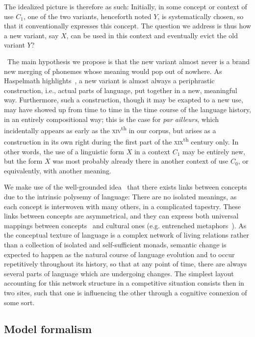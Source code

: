 \documentclass[12pt,twocolumn,amsmath,amssymb,aps,longbibliography]{revtex4-1}  %
\newcommand{\tit}{\textit}
\begin{document}
The idealized picture is therefore as such: Initially, in some concept or context of use $C_1$, one of the two variants, henceforth noted $Y$, is systematically chosen, so that it conventionally expresses this concept. The question we address is thus how a new variant, say $X$, can be used in this context and eventually evict the old variant $Y$?

\ The main hypothesis we propose is that the new variant almost never is a brand new merging of phonemes whose meaning would pop out of nowhere. As Haspelmath highlights~\cite{haspelmath1999grammaticalization}, a new variant is almost always a periphrastic construction, i.e., actual parts of language, put together in a new, meaningful way. Furthermore, such a construction, though it may be exapted to a new use, may have showed up from time to time in the time course of the language history, in an entirely compositional way; this is the case for \tit{par ailleurs}, which incidentally appears as early as the \textsc{xiv}\textsuperscript{th} in our corpus, but arises as a construction in its own right during the first part of the \textsc{xix}\textsuperscript{th} century only. In other words, the use of a linguistic form $X$ in a context $C_1$ may be entirely new, but the form $X$ was most probably already there in another context of use $C_0$, or equivalently, with another meaning.

We make use of the well-grounded idea~\cite{hudson2007language} that there exists links between concepts due to the intrinsic polysemy of language: There are no isolated meanings, as each concept is interwoven with many others, in a complicated tapestry. These links between concepts are asymmetrical, and they can express both universal mappings between concepts~\cite{heine1997cognitive,dellert2016using} and cultural ones (e.g. entrenched metaphors~\cite{lakoff2008metaphors}). As the conceptual texture of language is a complex network of living relations rather than a collection of isolated and self-sufficient monads, semantic change is expected to happen as the natural course of language evolution and to occur repetitively throughout its history, so that at any point of time, there are always several parts of language which are undergoing changes. The simplest layout accounting for this network structure in a competitive situation consists then in two sites, such that one is influencing the other through a cognitive connexion of some sort. 

\subsection*{Model formalism} 
\end{document}
